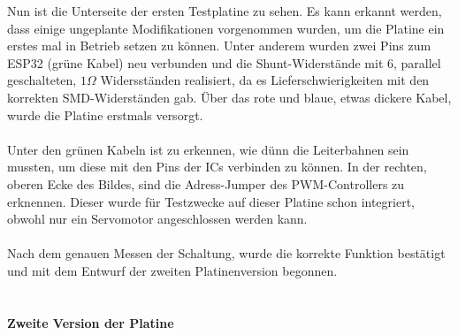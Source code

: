 \documentclass[titlepage,12pt,twoside]{article}
\begin{document}
\hfill \break
Nun ist die Unterseite der ersten Testplatine zu sehen. Es kann erkannt werden, dass einige ungeplante Modifikationen vorgenommen wurden, um die Platine ein erstes mal in Betrieb setzen zu können. Unter anderem wurden zwei Pins zum ESP32 (grüne Kabel)
neu verbunden und die Shunt-Widerstände mit 6, parallel geschalteten, $1\Omega$ Widersständen realisiert, da es Lieferschwierigkeiten mit den korrekten SMD-Widerständen gab. Über das rote und blaue, etwas dickere Kabel, wurde die Platine erstmals versorgt. \\
\\
Unter den grünen Kabeln ist zu erkennen, wie dünn die Leiterbahnen sein mussten, um diese mit den Pins der ICs verbinden zu können. In der rechten, oberen Ecke des Bildes, sind die Adress-Jumper des PWM-Controllers zu erknennen. Dieser wurde für Testzwecke 
auf dieser Platine schon integriert, obwohl nur ein Servomotor angeschlossen werden kann. \\
\\
Nach dem genauen Messen der Schaltung, wurde die korrekte Funktion bestätigt und mit dem Entwurf der zweiten Platinenversion begonnen. \\
\\

\paragraph{Zweite Version der Platine}
\hfill \break
\hfill \break
\end{document}
